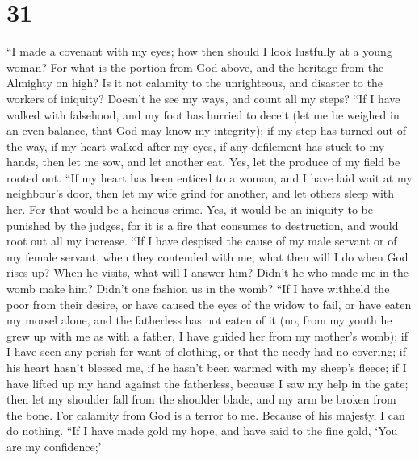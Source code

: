 \hypertarget{section-30}{%
\section{31}\label{section-30}}

 ``I made a covenant with my eyes; how then should I look
lustfully at a young woman?  For what is the portion from
God above, and the heritage from the Almighty on high?  Is
it not calamity to the unrighteous, and disaster to the workers of
iniquity?  Doesn't he see my ways, and count all my steps?
 ``If I have walked with falsehood, and my foot has
hurried to deceit  (let me be weighed in an even balance,
that God may know my integrity);  if my step has turned
out of the way, if my heart walked after my eyes, if any defilement has
stuck to my hands,  then let me sow, and let another eat.
Yes, let the produce of my field be rooted out.  ``If my
heart has been enticed to a woman, and I have laid wait at my
neighbour's door,  then let my wife grind for another,
and let others sleep with her.  For that would be a
heinous crime. Yes, it would be an iniquity to be punished by the
judges,  for it is a fire that consumes to destruction,
and would root out all my increase.  ``If I have despised
the cause of my male servant or of my female servant, when they
contended with me,  what then will I do when God rises
up? When he visits, what will I answer him?  Didn't he
who made me in the womb make him? Didn't one fashion us in the womb?
 ``If I have withheld the poor from their desire, or have
caused the eyes of the widow to fail,  or have eaten my
morsel alone, and the fatherless has not eaten of it 
(no, from my youth he grew up with me as with a father, I have guided
her from my mother's womb);  if I have seen any perish
for want of clothing, or that the needy had no covering; 
if his heart hasn't blessed me, if he hasn't been warmed with my sheep's
fleece;  if I have lifted up my hand against the
fatherless, because I saw my help in the gate;  then let
my shoulder fall from the shoulder blade, and my arm be broken from the
bone.  For calamity from God is a terror to me. Because
of his majesty, I can do nothing.  ``If I have made gold
my hope, and have said to the fine gold, `You are my confidence;'

